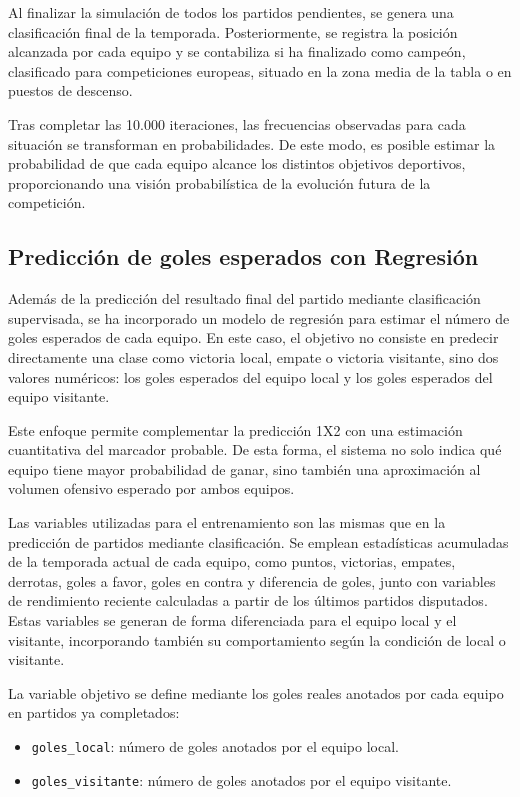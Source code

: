 Al finalizar la simulación de todos los partidos pendientes, se genera una clasificación final de la temporada. Posteriormente, se registra la posición alcanzada por cada equipo y se contabiliza si ha finalizado como campeón, clasificado para competiciones europeas, situado en la zona media de la tabla o en puestos de descenso.

Tras completar las 10.000 iteraciones, las frecuencias observadas para cada situación se transforman en probabilidades. De este modo, es posible estimar la probabilidad de que cada equipo alcance los distintos objetivos deportivos, proporcionando una visión probabilística de la evolución futura de la competición.

\subsection{Predicción de goles esperados con Regresión}

Además de la predicción del resultado final del partido mediante clasificación supervisada, se ha incorporado un modelo de regresión para estimar el número de goles esperados de cada equipo. En este caso, el objetivo no consiste en predecir directamente una clase como victoria local, empate o victoria visitante, sino dos valores numéricos:
los goles esperados del equipo local y los goles esperados del equipo visitante.

Este enfoque permite complementar la predicción 1X2 con una estimación cuantitativa del marcador probable. De esta forma, el sistema no solo indica qué equipo tiene mayor probabilidad de ganar, sino también una aproximación al volumen ofensivo esperado por ambos equipos.

Las variables utilizadas para el entrenamiento son las mismas que en la predicción de partidos mediante clasificación. Se emplean estadísticas acumuladas de la temporada actual de cada equipo, como puntos, victorias, empates, derrotas, goles a favor, goles en contra y diferencia de goles, junto con variables de rendimiento reciente calculadas a partir de los últimos partidos disputados. Estas variables se generan de forma diferenciada para el equipo local y el visitante, incorporando también su comportamiento según la condición de local o visitante.

La variable objetivo se define mediante los goles reales anotados por cada equipo en
partidos ya completados:

\begin{itemize}
    \item \texttt{goles\_local}: número de goles anotados por el equipo local.
    \item \texttt{goles\_visitante}: número de goles anotados por el equipo visitante.
\end{itemize}


